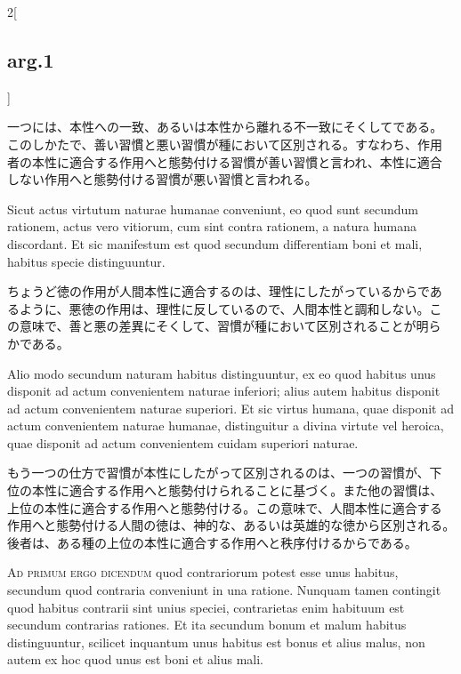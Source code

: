\documentclass[paper=a4paper,fontsize=10pt,jafontsize=9pt,titlepage]{jlreq}
\begin{document}
\begin{paracol}{2}[\subsection{arg.1}]
\switchcolumn

一つには、本性への一致、あるいは本性から離れる不一致にそくしてである。
このしかたで、善い習慣と悪い習慣が種において区別される。すなわち、作用
者の本性に適合する作用へと態勢付ける習慣が善い習慣と言われ、本性に適合
しない作用へと態勢付ける習慣が悪い習慣と言われる。

\switchcolumn*

Sicut actus virtutum naturae humanae conveniunt, eo quod sunt secundum
rationem, actus vero vitiorum, cum sint contra rationem, a natura
humana discordant. Et sic manifestum est quod secundum differentiam
boni et mali, habitus specie distinguuntur.

\switchcolumn

ちょうど徳の作用が人間本性に適合するのは、理性にしたがっているからであ
るように、悪徳の作用は、理性に反しているので、人間本性と調和しない。こ
の意味で、善と悪の差異にそくして、習慣が種において区別されることが明ら
かである。

\switchcolumn*

Alio modo secundum naturam habitus distinguuntur, ex eo quod habitus
unus disponit ad actum convenientem naturae inferiori; alius autem
habitus disponit ad actum convenientem naturae superiori. Et sic
virtus humana, quae disponit ad actum convenientem naturae humanae,
distinguitur a divina virtute vel heroica, quae disponit ad actum
convenientem cuidam superiori naturae.

\switchcolumn

もう一つの仕方で習慣が本性にしたがって区別されるのは、一つの習慣が、下
位の本性に適合する作用へと態勢付けられることに基づく。また他の習慣は、
上位の本性に適合する作用へと態勢付ける。この意味で、人間本性に適合する
作用へと態勢付ける人間の徳は、神的な、あるいは英雄的な徳から区別される。
後者は、ある種の上位の本性に適合する作用へと秩序付けるからである。

\switchcolumn*[\subsection{ad.1}]

{\scshape Ad primum ergo dicendum} quod contrariorum potest esse unus
habitus, secundum quod contraria conveniunt in una ratione. Nunquam
tamen contingit quod habitus contrarii sint unius speciei,
contrarietas enim habituum est secundum contrarias rationes. Et ita
secundum bonum et malum habitus distinguuntur, scilicet inquantum unus
habitus est bonus et alius malus, non autem ex hoc quod unus est boni
et alius mali.


\end{paracol}
\end{document}
